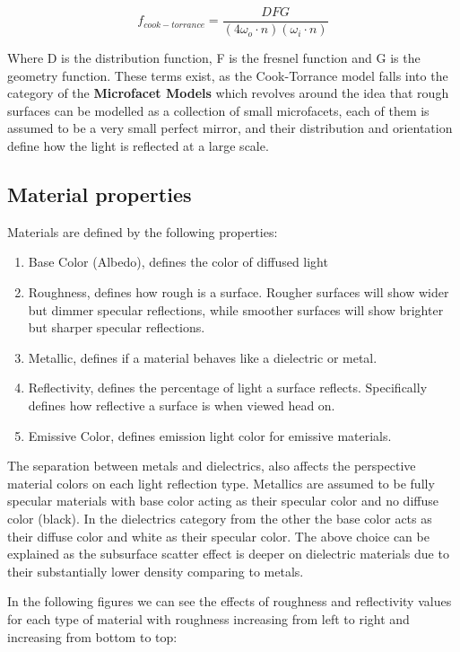 $$f_{cook-torrance} = \frac{DFG}{(4 \omega_o \cdot n)(\omega_i \cdot n)}$$

Where D is the distribution function, F is the fresnel function and G is the geometry function.
These terms exist, as the Cook-Torrance model falls into the category of the \textbf{Microfacet Models} which revolves around the idea
that rough surfaces can be modelled as a collection of small microfacets, each of them is assumed to be a very small perfect mirror,
and their distribution and orientation define how the light is reflected at a large scale.

\subsection{Material properties}
Materials are defined by the following properties:

\begin{enumerate}
    \item Base Color (Albedo), defines the color of diffused light
    \item Roughness, defines how rough is a surface. Rougher surfaces will show wider but dimmer specular reflections, while smoother
        surfaces will show brighter but sharper specular reflections.
    \item Metallic, defines if a material behaves like a dielectric or metal.
    \item Reflectivity, defines the percentage of light a surface reflects. Specifically defines how reflective a surface is when viewed
        head on.
    \item Emissive Color, defines emission light color for emissive materials.
\end{enumerate}

The separation between metals and dielectrics, also affects the perspective material colors on each light reflection type.
Metallics are assumed to be fully specular materials with base color acting as their specular color and no diffuse color (black).
In the dielectrics category from the other the base color acts as their diffuse color and white as their specular color.
The above choice can be explained as the subsurface scatter effect is deeper on dielectric materials due to their substantially
lower density comparing to metals.

In the following figures we can see the effects of roughness and reflectivity values for each type of material with
roughness increasing from left to right and increasing from bottom to top:

